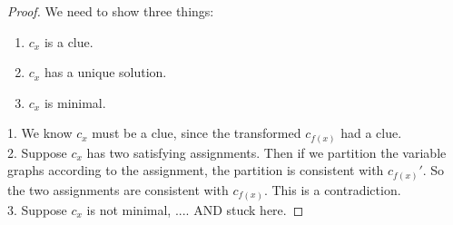 \documentclass[runningheads,a4paper]{llncs}
\begin{document}
\begin{proof}
We need to show three things:
\begin{enumerate}
\item $c_x$ is a clue.
\item $c_x$ has a unique solution.
\item $c_x$ is minimal.
\end{enumerate}

1. We know $c_x$ must be a clue, since the transformed $c_{f(x)}$ had a clue. \\
2. Suppose $c_x$ has two satisfying assignments. Then if we partition the variable graphs according to the assignment, the partition is consistent with $c_{f(x)}'$. So the two assignments are consistent with $c_{f(x)}$. This is a contradiction.\\
3. Suppose $c_x$ is not minimal, .... AND stuck here.

\end{proof}
\end{document}
